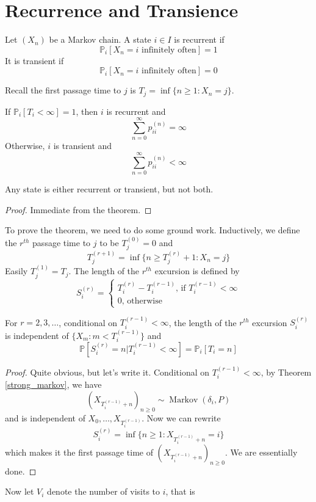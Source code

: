 \section{Recurrence and Transience}
\begin{definition}
    Let $(X_n)$ be a Markov chain.
    A state $i\in I$ is recurrent if
    $$\mathbb P_i[X_n=i\text{ infinitely often}]=1$$
    It is transient if
    $$\mathbb P_i[X_n=i\text{ infinitely often}]=0$$
\end{definition}
Recall the first passage time to $j$ is $T_j=\inf\{n\ge 1:X_n=j\}$.
\begin{theorem}\label{recur_trans}
    If $\mathbb P_i[T_i<\infty]=1$, then $i$ is recurrent and
    $$\sum_{n=0}^\infty p_{ii}^{(n)}=\infty$$
    Otherwise, $i$ is transient and
    $$\sum_{n=0}^\infty p_{ii}^{(n)}<\infty$$
\end{theorem}
\begin{corollary}
    Any state is either recurrent or transient, but not both.
\end{corollary}
\begin{proof}
    Immediate from the theorem.
\end{proof}
To prove the theorem, we need to do some ground work.
Inductively, we define the $r^{th}$ passage time to $j$ to be $T_j^{(0)}=0$ and
$$T_j^{(r+1)}=\inf\{n\ge T_j^{(r)}+1:X_n=j\}$$
Easily $T_j^{(1)}=T_j$.
The length of the $r^{th}$ excursion is defined by
$$S_i^{(r)}=\begin{cases}
    T_i^{(r)}-T_i^{(r-1)}\text{, if $T_i^{(r-1)}<\infty$}\\
    0\text{, otherwise}
\end{cases}$$
\begin{lemma}\label{tisi}
    For $r=2,3,\ldots$, conditional on $T_i^{(r-1)}<\infty$, the length of the $r^{th}$ excursion $S_i^{(r)}$ is independent of $\{X_m:m<T_i^{(r-1)}\}$ and
    $$\mathbb P[S_i^{(r)}=n|T_i^{(r-1)}<\infty]=\mathbb P_i[T_i=n]$$
\end{lemma}
\begin{proof}
    Quite obvious, but let's write it.
    Conditional on $T_i^{(r-1)}<\infty$, by Theorem \ref{strong_markov}, we have
    $$(X_{T_i^{(r-1)}+n})_{n\ge 0}\sim\operatorname{Markov}(\delta_i,P)$$
    and is independent of $X_0,\ldots,X_{T_i^{(r-1)}}$.
    Now we can rewrite
    $$S_i^{(r)}=\inf\{n\ge 1:X_{T_i^{(r-1)}+n}=i\}$$
    which makes it the first passage time of $(X_{T_i^{(r-1)}+n})_{n\ge 0}$.
    We are essentially done.
\end{proof}
Now let $V_i$ denote the number of visits to $i$, that is
